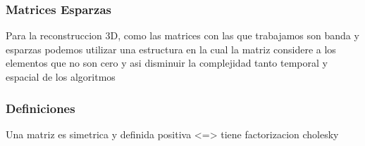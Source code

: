 \subsubsection{Matrices Esparzas}
Para la reconstruccion 3D, como las matrices con las que trabajamos son banda y esparzas podemos utilizar una estructura en la cual la matriz considere a los elementos que no son cero y asi disminuir la complejidad tanto temporal y espacial de los algoritmos 

\subsubsection{Definiciones}
Una matriz es simetrica y definida positiva <=> tiene factorizacion cholesky


